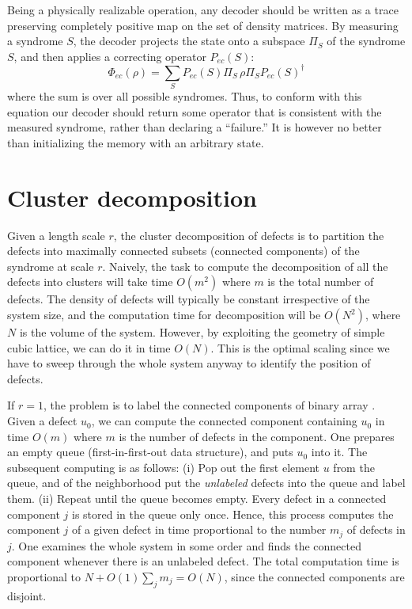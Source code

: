Being a physically realizable operation, 
any decoder should be written as a trace preserving completely positive map on the set of density matrices.
By measuring a syndrome $S$, the decoder projects the state onto a subspace $\Pi_S$ of the syndrome $S$,
and then applies a correcting operator $P_{ec}(S)$:
\[
\Phi_{ec}(\rho)=\sum_S P_{ec}(S)\Pi_S \, \rho \Pi_S P_{ec}(S)^\dag
\]
where the sum is over all possible syndromes.
Thus, to conform with this equation 
our decoder should return some operator that is consistent with the measured syndrome,
rather than declaring a ``failure.'' 
It is however no better than initializing the memory with an arbitrary state.

\section{Cluster decomposition}
\label{subs:clusters}
\newcommand{\ls}{r} %

Given a length scale $\ls$, the cluster decomposition of defects
is to partition the defects into maximally connected subsets
(connected components) of the syndrome at scale $\ls$.
Naively, the task to compute the decomposition of all the defects into clusters
will take time $O(m^2)$ where $m$ is the total number of defects.
The density of defects will typically be constant irrespective of the system size,
and the computation time for decomposition will be $O(N^2)$,
where $N$ is the volume of the system.
However, by exploiting the geometry of simple cubic lattice,
we can do it in time $O(N)$.
This is the optimal scaling
since we have to sweep through the whole system anyway
to identify the position of defects.

If $\ls = 1$, the problem is to label the connected components of binary array \cite{AsanoTanaka2010,KiranEtAl2011Labeling}.
Given a defect $u_0$, we can compute the connected component
containing $u_0$ in time $O(m)$ where $m$ is the number of defects in the component.
One prepares an empty queue (first-in-first-out data structure),
and puts $u_0$ into it.
The subsequent computing is as follows:
(i) Pop out the first element $u$ from the queue,
and of the neighborhood put the \emph{unlabeled} defects into the queue and label them.
(ii) Repeat until the queue becomes empty.
Every defect in a connected component $j$ is stored in the queue only once.
Hence, this process computes the component $j$ of a given defect
in time proportional to the number $m_j$ of defects in $j$.
One examines the whole system in some order
and finds the connected component whenever there is an unlabeled defect.
The total computation time is proportional to $N + O(1)\sum_j m_j = O(N)$,
since the connected components are disjoint.


